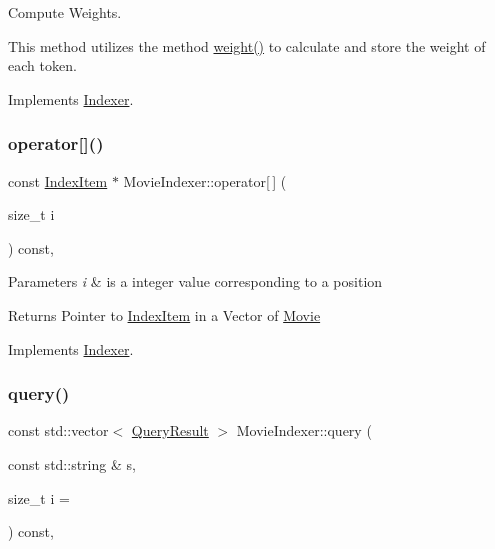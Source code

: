 Compute Weights. 

This method utilizes the method \hyperlink{class_movie_indexer_a3caddb617dd3324b6535a22aff8ea987}{weight()} to calculate and store the weight of each token. 

Implements \hyperlink{class_indexer_a84f50c7bac96cd5a8daa18899a39bb5d}{Indexer}.

\mbox{\label{class_movie_indexer_a088b5ec171f497ca107009f9c8486c2a}} 
\subsubsection{\texorpdfstring{operator[]()}{operator[]()}}
{\footnotesize\ttfamily const \hyperlink{class_index_item}{Index\+Item} $\ast$ Movie\+Indexer\+::operator\mbox{[}$\,$\mbox{]} (\begin{DoxyParamCaption}\item[{size\+\_\+t}]{i }\end{DoxyParamCaption}) const\hspace{0.3cm}{\ttfamily [override]}, {\ttfamily [virtual]}}


\begin{DoxyParams}{Parameters}
{\em i} & is a integer value corresponding to a position \\
\hline
\end{DoxyParams}
\begin{DoxyReturn}{Returns}
Pointer to \hyperlink{class_index_item}{Index\+Item} in a Vector of \hyperlink{class_movie}{Movie} 
\end{DoxyReturn}


Implements \hyperlink{class_indexer}{Indexer}.

\mbox{\label{class_movie_indexer_a06225f4ac31f12e8ed253d0d2682d07a}} 
\subsubsection{\texorpdfstring{query()}{query()}}
{\footnotesize\ttfamily const std\+::vector$<$ \hyperlink{class_query_result}{Query\+Result} $>$ Movie\+Indexer\+::query (\begin{DoxyParamCaption}\item[{const std\+::string \&}]{s,  }\item[{size\+\_\+t}]{i = {} }\end{DoxyParamCaption}) const\hspace{0.3cm}{\ttfamily [override]}, {\ttfamily [virtual]}}



